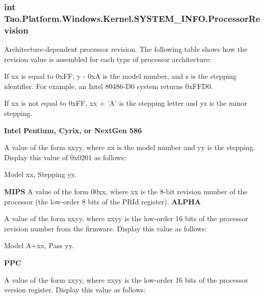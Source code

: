 \hypertarget{struct_tao_1_1_platform_1_1_windows_1_1_kernel_1_1_s_y_s_t_e_m___i_n_f_o_a3390dea5c0bcfaeae36cd427d01c51a2}{
\subsubsection[{ProcessorRevision}]{\setlength{\rightskip}{0pt plus 5cm}int {\bf Tao.Platform.Windows.Kernel.SYSTEM\_\-INFO.ProcessorRevision}}}
\label{struct_tao_1_1_platform_1_1_windows_1_1_kernel_1_1_s_y_s_t_e_m___i_n_f_o_a3390dea5c0bcfaeae36cd427d01c51a2}


Architecture-\/dependent processor revision. The following table shows how the revision value is assembled for each type of processor architecture: 

\begin{TabularC}{2}
\hline
Processor} &Description  \\\cline{1-2}
Intel 80386 or 80486} &A value of the form xxyz. \\\cline{1-2}
\end{TabularC}


If xx is equal to 0xFF, y -\/ 0xA is the model number, and z is the stepping identifier. For example, an Intel 80486-\/D0 system returns 0xFFD0. 

If xx is not equal to 0xFF, xx + 'A' is the stepping letter and yz is the minor stepping. 

{\bfseries Intel Pentium, Cyrix, or NextGen 586}  

A value of the form xxyy, where xx is the model number and yy is the stepping. Display this value of 0x0201 as follows: 

Model xx, Stepping yy. 

{\bfseries MIPS}  A value of the form 00xx, where xx is the 8-\/bit revision number of the processor (the low-\/order 8 bits of the PRId register).    {\bfseries ALPHA}  

A value of the form xxyy, where xxyy is the low-\/order 16 bits of the processor revision number from the firmware. Display this value as follows: 

Model A+xx, Pass yy. 

{\bfseries PPC}  

A value of the form xxyy, where xxyy is the low-\/order 16 bits of the processor version register. Display this value as follows: 

